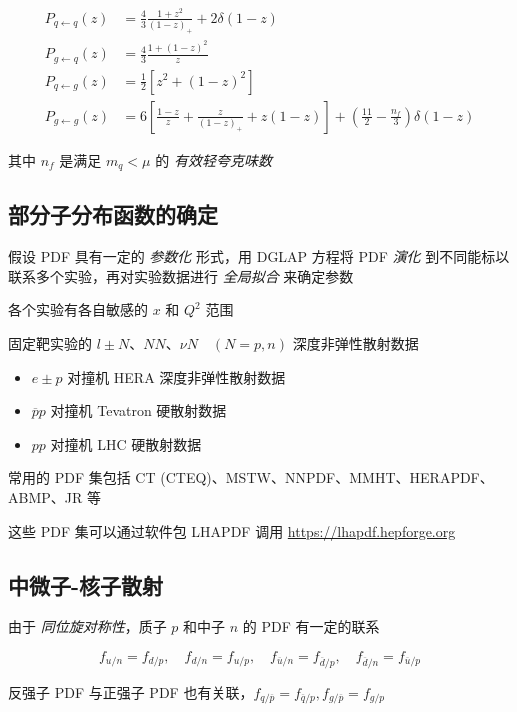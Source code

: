 \begin{align}
    P_{q \gets q}(z) &= \frac{4}{3} \frac{1+z^2}{(1-z)_+} + 2\delta(1-z) \\
    P_{g \gets q}(z) &= \frac{4}{3} \frac{1+(1-z)^2}{z} \\
    P_{q \gets g}(z) &= \frac{1}{2} \left[z^2 + (1-z)^2\right] \\
    P_{g \gets g}(z) &= 6 \left[\frac{1-z}{z} + \frac{z}{(1-z)_+} + z(1-z)\right] + \left(\frac{11}{2} - \frac{n_f}{3}\right) \delta(1-z)
\end{align}

其中 $n_f$ 是满足 $m_q < \mu$ 的 \emph{有效轻夸克味数}

\subsection{部分子分布函数的确定}

假设 PDF 具有一定的 \emph{参数化} 形式，用 DGLAP 方程将 PDF \emph{演化} 到不同能标以联系多个实验，再对实验数据进行 \emph{全局拟合} 来确定参数

各个实验有各自敏感的 $x$ 和 $Q^2$ 范围

固定靶实验的 $l \pm N$、$NN$、$\nu N \quad (N = p, n)$ 深度非弹性散射数据

\begin{itemize}
    \item $e \pm p$ 对撞机 HERA 深度非弹性散射数据
    \item $\overline{p} p$ 对撞机 Tevatron 硬散射数据
    \item $pp$ 对撞机 LHC 硬散射数据
\end{itemize}

常用的 PDF 集包括 CT (CTEQ)、MSTW、NNPDF、MMHT、HERAPDF、ABMP、JR 等

这些 PDF 集可以通过软件包 LHAPDF 调用 \url{https://lhapdf.hepforge.org}

\subsection{中微子-核子散射}

由于 \emph{同位旋对称性}，质子 $p$ 和中子 $n$ 的 PDF 有一定的联系

\begin{equation}
    f_{u/n} = f_{d/p}, \quad f_{d/n} = f_{u/p}, \quad f_{\overline{u}/n} = f_{\overline{d}/p}, \quad f_{\overline{d}/n} = f_{\overline{u}/p}
\end{equation}

反强子 PDF 与正强子 PDF 也有关联，$f_{q/\overline{p}} = f_{\overline{q}/p}, f_{g/\overline{p}} = f_{g/p}$

